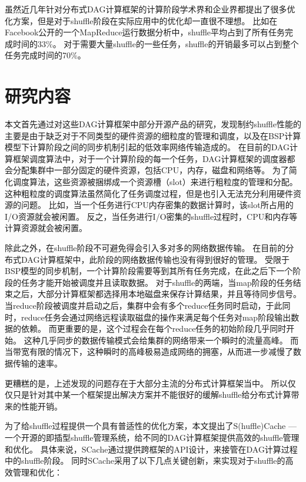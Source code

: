 虽然近几年针对分布式DAG计算框架的计算阶段学术界和企业界都提出了很多优化方案\cite{pacman, babu, quincy, sync}，但是对于shuffle阶段在实际应用中的优化却一直很不理想。
比如在Facebook公开的一个MapReduce运行数据分析中，shuffle平均占到了所有任务完成时间的33\%。
对于需要大量shuffle的一些任务，shuffle的开销最多可以占到整个任务完成时间的70\%\cite{managing}。



\section{研究内容}

本文首先通过对这些DAG计算框架中部分开源产品的研究，发现制约shuffle性能的主要是由于缺乏对于不同类型的硬件资源的细粒度的管理和调度，以及在BSP计算模型下计算阶段之间的同步机制引起的低效率网络传输造成的。
在目前的DAG计算框架调度算法中，对于一个计算阶段的每一个任务，DAG计算框架的调度器都会分配集群中一部分固定的硬件资源，包括CPU，内存，磁盘和网络等。
为了简化调度算法，这些资源被捆绑成一个资源槽（slot）来进行粗粒度的管理和分配。
这种粗粒度的调度算法虽然简化了任务调度过程，但是也引入无法充分利用硬件资源的问题。
比如，当一个任务进行CPU内存密集的数据计算时，该slot所占用的I/O资源就会被闲置。
反之，当任务进行I/O密集的shuffle过程时，CPU和内存等计算资源就会被闲置。

除此之外，在shuffle阶段不可避免得会引入多对多的网络数据传输。
在目前的分布式DAG计算框架中，此阶段的网络数据传输也没有得到很好的管理。
受限于BSP模型的同步机制，一个计算阶段需要等到其所有任务完成，在此之后下一个阶段的任务才能开始被调度并且读取数据。
对于shuffle的两端，当map阶段的任务结束之后，大部分计算框架都选择用本地磁盘来保存计算结果，并且等待同步信号。
当reduce阶段被调度并启动之后，集群中会有多个reduce任务同时启动，于此同时，reduce任务会通过网络远程读取磁盘的操作来满足每个任务对map阶段输出数据的依赖。
而更重要的是，这个过程会在每个reduce任务的初始阶段几乎同时开始。
这种几乎同步的数据传输模式会给集群的网络带来一个瞬时的流量高峰。
而当带宽有限的情况下，这种瞬时的高峰极易造成网络的拥塞，从而进一步减慢了数据传输的速率。

更糟糕的是，上述发现的问题存在于大部分主流的分布式计算框架当中。
所以仅仅只是针对其中某一个框架提出解决方案并不能很好的缓解shuffle给分布式计算带来的性能开销。

为了给shuffle过程提供一个具有普适性的优化方案，本文提出了S(huffle)Cache --- 一个开源的即插型shuffle管理系统，给不同的DAG计算框架提供高效的shuffle管理和优化。
具体来说，SCache通过提供跨框架的API设计，来接管在DAG计算过程中的shuffle阶段。
同时SCache采用了以下几点关键创新，来实现对于shuffle的高效管理和优化：

